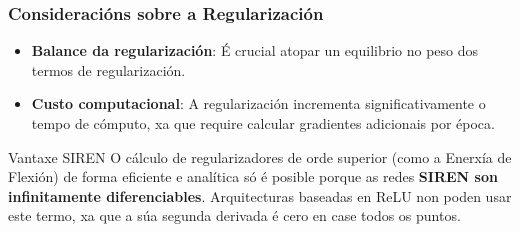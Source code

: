\documentclass[xcolor=dvipsnames]{beamer}
\begin{document}
\begin{frame}
\frametitle{Consideracións sobre a Regularización}

\begin{itemize}
    \item \textbf{Balance da regularización}: É crucial atopar un equilibrio no peso dos termos de regularización.

    \vspace{0.4cm}
    \item \textbf{Custo computacional}: A regularización incrementa significativamente o tempo de cómputo, xa que require calcular gradientes adicionais por época.
\end{itemize}

\vfill

\begin{alertblock}{Vantaxe SIREN}
    O cálculo de regularizadores de orde superior (como a Enerxía de Flexión) de forma eficiente e analítica só é posible porque as redes \textbf{SIREN son infinitamente diferenciables}. Arquitecturas baseadas en ReLU non poden usar este termo, xa que a súa segunda derivada é cero en case todos os puntos.
\end{alertblock}


\end{frame}


\end{document}
